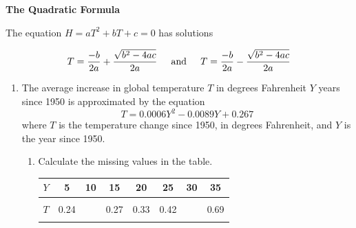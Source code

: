 \documentclass[12pt]{article}
\begin{document}
 \vspace{.2in}
 
 \begin{center}
\textbf{The Quadratic Formula}
\vspace{.1in}

The equation $H=aT^2+bT+c=0$ has solutions 


$$\displaystyle T=\frac{-b}{2a} + \frac{\sqrt{b^2-4ac}}{2a} \hspace{.2in} \text{and} \hspace{.2in}T=\frac{-b}{2a} - \frac{\sqrt{b^2-4ac}}{2a}$$

 \end{center}

\hrulefill

\newpage

\begin{enumerate}

\item The average increase in global temperature $T$ in degrees Fahrenheit $Y$ years since 1950 is approximated by the equation $$T = 0.0006Y^2-0.0089Y+0.267$$
where $T$ is the temperature change since 1950, in degrees Fahrenheit, and $Y$ is the year since 1950.

\begin{enumerate}
\item Calculate the missing values in the table.



\begin{center}
\begin{tabular} {|c ||c |c |c |c |c |c |c |} \hline
$Y$ & \hspace{.25in}5  \hspace{.25in}   &\hspace{.25in} 10\hspace{.25in} & \hspace{.25in} 15   \hspace{.25in} &\hspace{.25in} 20  \hspace{.25in}  & \hspace{.25in}25   \hspace{.25in}  & \hspace{.25in}30  \hspace{.25in}& \hspace{.25in} 35 \hspace{.25in}  \\ \hline
&&&&&&& \\
$T$ &0.24 &  & 0.27 & 0.33 & 0.42 &   & 0.69  \\ 
&&&&&&& \\ \hline
\end{tabular}
\end{center}



\end{enumerate}
\end{enumerate}
\end{document}
